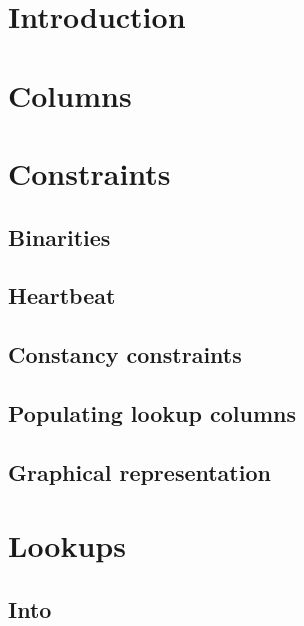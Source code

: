 
\section{Introduction                   \lispNone{}}     \label{gas: purpose}                      
\section{Columns                        \lispTodo{}}     \label{gas: columns}                      
\section{Constraints                    \lispTodo{}}
\subsection{Binarities                  \lispTodo{}}     \label{gas: binarities}                   
\subsection{Heartbeat                   \lispTodo{}}     \label{gas: heartbeat}                    
\subsection{Constancy constraints       \lispTodo{}}     \label{gas: constancies}                  
\subsection{Populating lookup columns   \lispTodo{}}     \label{gas: populating lookups}           
\subsection{Graphical representation    \lispNone{}}     \label{gas: graphical representation}     
\section{Lookups                        \lispTodo{}}
\subsection{Into \wcpMod{}              \lispTodo{}}     \label{gas: lookup into wcp}              
